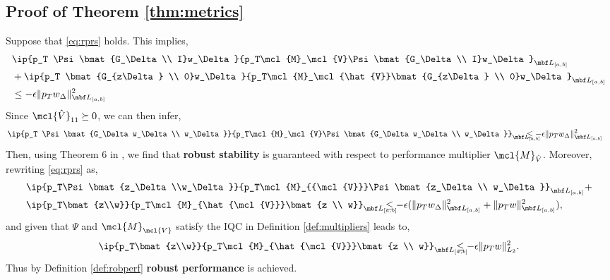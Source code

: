 \subsection{Proof of Theorem \ref{thm:metrics}}\label{proof:theorem1}
Suppose that \eqref{eq:rprs} holds. This implies,
\begin{align*}
	 & \ip{p_T \Psi\bmat{G_\Delta \\ I}w_\Delta}{p_T\mcl{M}_\mcl{V}\Psi\bmat{G_\Delta \\ I}w_\Delta}_{\mbf L_{[a, b]}} \\ &+ \ip{p_T \bmat{G_{z\Delta} \\ 0}w_\Delta}{p_T\mcl{M}_\mcl{\hat{V}}\bmat{G_{z\Delta} \\ 0}w_\Delta}_{\mbf L_{[a, b]}}\\ &\leq -\epsilon \|p_Tw_\Delta\|^2_{\mbf L_{[a, b]}}
\end{align*}
Since $\mcl{\hat{V}}_{11}\succeq0$, we can then infer,
\begin{align*}
	 & \ip{p_T \Psi\bmat{G_\Delta  w_\Delta\\ w_\Delta}}{p_T\mcl{M}_\mcl{V}\Psi\bmat{G_\Delta w_\Delta \\ w_\Delta}}_{\mbf L_{[a, b]}}\!\!\!\!\!\!\!\!\!\!\!\!\leq -\epsilon \|p_Tw_\Delta\|^2_{\mbf L_{[a, b]}}
\end{align*}
Then, using Theorem 6 in \cite{10156335}, we find that \textbf{robust stability} is guaranteed with respect to performance multiplier $\mcl{M}_{\hat{V}}$. Moreover, rewriting \eqref{eq:rprs} as,
\begin{align*}
	 & \ip{p_T\Psi\bmat{z_\Delta\\w_\Delta}}{p_T\mcl{M}_{{\mcl{V}}}\Psi\bmat{z_\Delta \\ w_\Delta}}_{\mbf L_{[a, b]}} + \\&\ip{p_T\bmat{z\\w}}{p_T\mcl{M}_{\hat{\mcl{V}}}\bmat{z \\ w}}_{\mbf L_{[a, b]}}
	\!\!\!\!\!\!\!\!\!\leq  -\epsilon (\|p_T{w_\Delta}\|^2_{\mbf L_{[a, b]}}+\|p_T w\|^2_{\mbf L_{[a, b]}}),
\end{align*}
and given that $\Psi$ and $\mcl{M}_\mcl{V}$ satisfy the IQC in Definition \ref{def:multipliers} leads to,
\begin{align*}
	\ip{p_T\bmat{z\\w}}{p_T\mcl{M}_{\hat{\mcl{V}}}\bmat{z \\ w}}_{\mbf L_{[a, b]}}\!\!\!\!\!\!\!\!\!\leq  -\epsilon \|p_T w\|^2_{L_2}.
\end{align*}
Thus by Definition \ref{def:robperf} \textbf{robust performance} is achieved.
